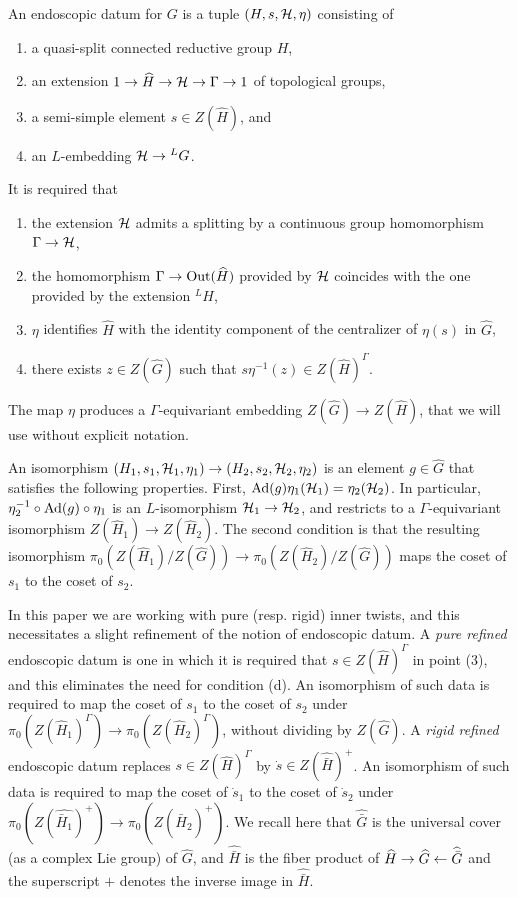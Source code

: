 \documentclass{article}
\theoremstyle{definition}
\numberwithin{equation}{section}
\renewcommand{\-}{\hyp{}}
\begin{document}
An endoscopic datum for $G$ is a tuple $(H,s,\mathcal{H},\eta)$ consisting of
\begin{enumerate}[label=(\arabic*)]
	\item a quasi-split connected reductive group $H$,
	\item an extension $1 \to \widehat H \to \mathcal{H} \to \Gamma \to 1$ of topological groups,
	\item a semi-simple element $s \in Z(\hat H)$, and
	\item an $L$\-embedding $\mathcal{H} \to {^LG}$.
\end{enumerate}
It is required that
\begin{enumerate}[label=(\alph*)]
	\item the extension $\mathcal{H}$ admits a splitting by a continuous group homomorphism $\Gamma \to \mathcal{H}$,
	\item the homomorphism $\Gamma \to \textrm{Out}(\widehat H)$ provided by $\mathcal{H}$ coincides with the one provided by the extension $^LH$,
	\item $\eta$ identifies $\hat H$ with the identity component of the centralizer of $\eta(s)$ in $\hat G$,
	\item there exists $z \in Z(\hat G)$ such that $s\eta^{-1}(z) \in Z(\hat H)^\Gamma$.
\end{enumerate}
The map $\eta$ produces a $\Gamma$-equivariant embedding $Z(\hat G) \to Z(\hat H)$, that we will use without explicit notation.

An isomorphism $(H_1,s_1,\mathcal{H}_1,\eta_1) \to (H_2,s_2,\mathcal{H}_2,\eta_2)$ is an element $g \in \hat G$ that satisfies the following properties. First, $\textrm{Ad}(g)\eta_1(\mathcal{H}_1)=\eta_2(\mathcal{H}_2)$. In particular, $\eta_2^{-1}\circ\textrm{Ad}(g)\circ\eta_1$ is an $L$\-isomorphism $\mathcal{H}_1 \to \mathcal{H}_2$, and restricts to a $\Gamma$-equivariant isomorphism $Z(\hat H_1) \to Z(\hat H_2)$. The second condition is that the resulting isomorphism $\pi_0(Z(\hat H_1)/Z(\hat G)) \to \pi_0(Z(\hat H_2)/Z(\hat G))$ maps the coset of $s_1$ to the coset of $s_2$.

In this paper we are working with pure (resp. rigid) inner twists, and this necessitates a slight refinement of the notion of endoscopic datum. A \emph{pure refined} endoscopic datum is one in which it is required that $s \in Z(\hat H)^\Gamma$ in point (3), and this eliminates the need for condition (d). An isomorphism of such data is required to map the coset of $s_1$ to the coset of $s_2$ under $\pi_0(Z(\hat H_1)^\Gamma) \to \pi_0(Z(\hat H_2)^\Gamma)$, without dividing by $Z(\hat G)$. A \emph{rigid refined} endoscopic datum replaces $s \in Z(\hat H)^\Gamma$ by $\dot s \in Z(\hat{\bar H} )^+$. An isomorphism of such data is required to map the coset of $\dot s_1$ to the coset of $\dot s_2$ under $\pi_0(Z(\hat{\bar H_1})^+) \to \pi_0(Z(\hat{ \bar H_2})^+)$. We recall here that $\hat{\bar G}$ is the universal cover (as a complex Lie group) of $\hat G$, and $\hat{\bar H}$ is the fiber product of $\widehat H \to \widehat G \leftarrow \widehat{\bar G}$ and the superscript $+$ denotes the inverse image in $\hat{\bar H}.$
\end{document}
